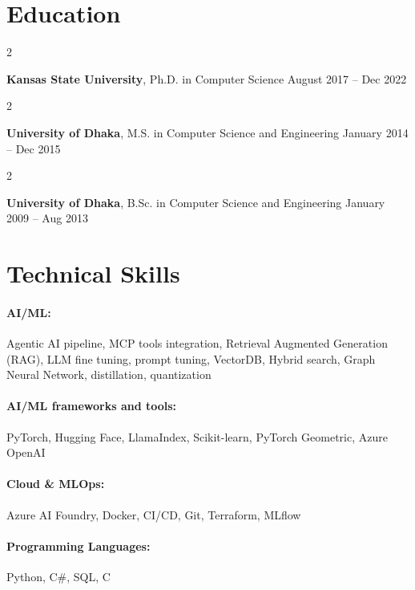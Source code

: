 \documentclass[10pt, letterpaper]{article}
\newenvironment{twocolentry}[2][]{
    \onecolentry
    \def\secondColumn{#2}
    \setcolumnwidth{\fill, 4.5 cm}
    \begin{paracol}{2}
}{
    \switchcolumn \raggedleft \secondColumn
    \end{paracol}
    \endonecolentry
} %
\begin{document}
\section{Education}

        \begin{twocolentry}{
            August 2017 – Dec 2022
        }
            \textbf{Kansas State University}, Ph.D. in Computer Science\end{twocolentry}

        \begin{twocolentry}{
            January 2014 – Dec 2015
        }
            \textbf{University of Dhaka}, M.S. in Computer Science and Engineering\end{twocolentry}

        \begin{twocolentry}{
            January 2009 – Aug 2013
        }
            \textbf{University of Dhaka}, B.Sc. in Computer Science and Engineering\end{twocolentry}

\vspace{-1mm}
\section{Technical Skills}

        \paragraph{AI/ML:} Agentic AI pipeline, MCP tools integration, Retrieval Augmented Generation (RAG), LLM fine tuning, prompt tuning, VectorDB, Hybrid search, Graph Neural Network, distillation, quantization
        \vspace{-4mm}
        \paragraph{AI/ML frameworks and tools:} PyTorch, Hugging Face, LlamaIndex, Scikit-learn, PyTorch Geometric, Azure OpenAI
        \vspace{-4mm}
        \paragraph{Cloud \& MLOps:} Azure AI Foundry, Docker, CI/CD, Git, Terraform, MLflow
        \vspace{-4mm}
        \paragraph{Programming Languages:} Python, C\#, SQL, C
\end{document}
